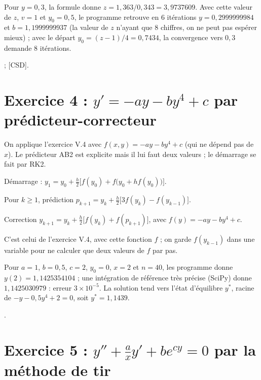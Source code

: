 
\Verif Pour $y = 0{,}3$, la formule donne $z = 1{,}363/0{,}343 = 3{,}9737609$.
Avec cette valeur de $z$, $v = 1$ et $y_0 = 0{,}5$, le programme retrouve en 6
itérations $y = 0{,}2999999984$ et $b = 1{,}1999999937$ (la valeur de $z$ n'ayant que 8
chiffres, on ne peut pas espérer mieux) ; avec le départ $y_0 = (z-1)/4 =
0{,}7434$, la convergence vers $0{,}3$ demande 8 itérations.

\Refs {} ; [CSD].

\section{\texorpdfstring{Exercice 4 : $y' = -ay - by^4 + c$ par prédicteur-correcteur}{Exercice 4 : y' = -ay - by\textasciicircum 4 + c par prédicteur-correcteur}}

\Pourquoi On applique l'exercice V.4 avec $f(x, y) = -ay - by^4 + c$ (qui ne
dépend pas de $x$). Le prédicteur AB2 est explicite mais il lui faut deux
valeurs ; le démarrage se fait par RK2.

\Etapes
{} Démarrage : $y_1 = y_0 + \frac h2\bigl[f(y_0) + f\bigl(y_0 + hf(y_0)\bigr)\bigr]$.

 Pour $k \ge 1$, prédiction
$p_{k+1} = y_k + \frac h2\bigl[3f(y_k) - f(y_{k-1})\bigr]$.

 Correction $y_{k+1} = y_k + \frac h2\bigl[f(y_k) + f(p_{k+1})\bigr]$,
avec $f(y) = -ay - by^4 + c$.

 C'est celui de l'exercice V.4, avec cette fonction
$f$ ; on garde $f(y_{k-1})$ dans une variable pour ne calculer que deux
valeurs de $f$ par pas.


\Verif Pour $a = 1$, $b = 0{,}5$, $c = 2$, $y_0 = 0$, $x = 2$ et $n = 40$, les
programme donne $y(2) = 1{,}1425354104$ ; une intégration de référence
très précise (SciPy) donne $1{,}1425030979$ : erreur $3\times 10^{-5}$. La
solution tend vers l'état d'équilibre $y^*$, racine de $-y - 0{,}5y^4 + 2 = 0$,
soit $y^* = 1{,}1439$.

\Refs {}.

\section{\texorpdfstring{Exercice 5 : $y'' + \frac{a}{x}y' + be^{cy} = 0$ par la méthode de tir}{Exercice 5 : y'' + (a/x)y' + b exp(cy) = 0 par la méthode de tir}}

